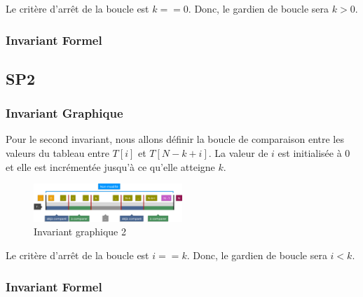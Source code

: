 Le critère d'arrêt de la boucle est $k ==0$. Donc, le gardien de boucle sera
$k > 0$.

\subsubsection{Invariant Formel}

\begin{center}
\end{center}

\subsection{SP2}
\subsubsection{Invariant Graphique}
Pour le second invariant, nous allons définir la boucle de comparaison entre les
valeurs du tableau entre $T[i]$ et $T[N-k+i]$. La valeur de $i$ est initialisée 
à 0 et elle est incrémentée jusqu'à ce qu'elle atteigne $k$.

\begin{figure}[h]
   \centering
   \includegraphics[width=0.5\textwidth]{sp2.pdf}
   \caption{Invariant graphique 2}
   \label{fig:invariant2}
\end{figure}

Le critère d'arrêt de la boucle est $i == k$. Donc, le gardien de boucle sera
$i < k$.
\subsubsection{Invariant Formel}

\begin{center}
\end{center}